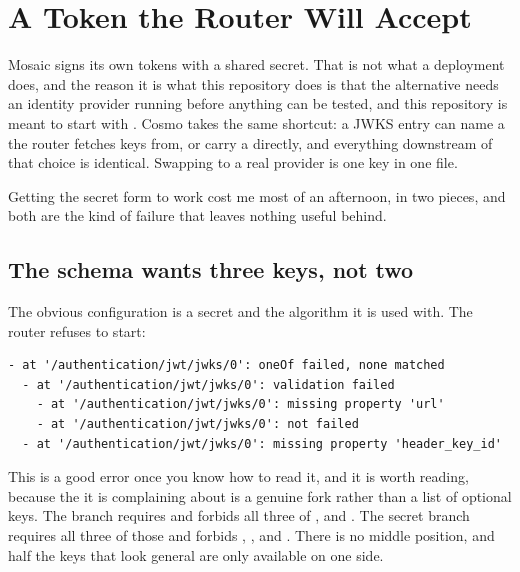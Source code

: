 \section{A Token the Router Will Accept}
\label{sec:ch15-a-token-the-router-accepts}
%

Mosaic signs its own tokens with a shared secret. That is not what a deployment
does, and the reason it is what this repository does is that the alternative
needs an identity provider running before anything can be tested, and this
repository is meant to start with . Cosmo takes the
same shortcut: a JWKS entry can name a  the router fetches keys from,
or carry a  directly, and everything downstream of that choice is
identical. Swapping to a real provider is one key in one file.

Getting the secret form to work cost me most of an afternoon, in two pieces,
and both are the kind of failure that leaves nothing useful behind.

\subsection*{The schema wants three keys, not two}

%
The obvious configuration is a secret and the algorithm it is used with. The
router refuses to start:

\begin{verbatim}
- at '/authentication/jwt/jwks/0': oneOf failed, none matched
  - at '/authentication/jwt/jwks/0': validation failed
    - at '/authentication/jwt/jwks/0': missing property 'url'
    - at '/authentication/jwt/jwks/0': not failed
  - at '/authentication/jwt/jwks/0': missing property 'header_key_id'
\end{verbatim}

This is a good error once you know how to read it, and it is worth reading,
because the  it is complaining about is a genuine fork rather than
a list of optional keys. The  branch requires  and forbids
all three of ,  and
. The secret branch requires all three of those and
forbids , ,  and
. There is no middle position, and half the keys
that look general are only available on one side.

